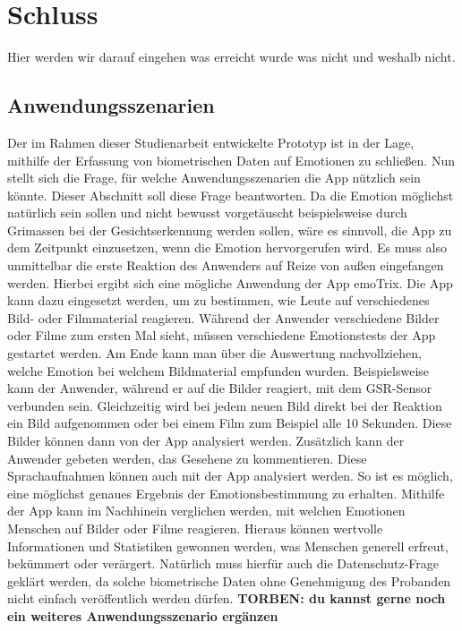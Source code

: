 \section{Schluss}
Hier werden wir darauf eingehen was erreicht wurde was nicht und weshalb nicht.
\subsection{Anwendungsszenarien}
Der im Rahmen dieser Studienarbeit entwickelte Prototyp ist in der Lage, mithilfe der Erfassung von biometrischen Daten auf Emotionen zu schließen. Nun stellt sich die Frage, für welche Anwendungsszenarien die App nützlich sein könnte. Dieser Abschnitt soll diese Frage beantworten. \newline \newline
Da die Emotion möglichst natürlich sein sollen und nicht bewusst vorgetäuscht beispielsweise durch Grimassen bei der Gesichtserkennung werden sollen, wäre es sinnvoll, die App zu dem Zeitpunkt einzusetzen, wenn die Emotion hervorgerufen wird. Es muss also unmittelbar die erste Reaktion des Anwenders auf Reize von außen eingefangen werden. Hierbei ergibt sich eine mögliche Anwendung der App emoTrix. \newline
Die App kann dazu eingesetzt werden, um zu bestimmen, wie Leute auf verschiedenes Bild- oder Filmmaterial reagieren. Während der Anwender verschiedene Bilder oder Filme zum ersten Mal sieht, müssen verschiedene Emotionstests der App gestartet werden. Am Ende kann man über die Auswertung nachvollziehen, welche Emotion bei welchem Bildmaterial empfunden wurden. Beispielsweise kann der Anwender, während er auf die Bilder reagiert, mit dem GSR-Sensor verbunden sein. Gleichzeitig wird bei jedem neuen Bild direkt bei der Reaktion ein Bild aufgenommen oder bei einem Film zum Beispiel alle 10 Sekunden. Diese Bilder können dann von der App analysiert werden. Zusätzlich kann der Anwender gebeten werden, das Gesehene zu kommentieren. Diese Sprachaufnahmen können auch mit der App analysiert werden. So ist es möglich, eine möglichst genaues Ergebnis der Emotionsbestimmung zu erhalten. \newline
Mithilfe der App kann im Nachhinein verglichen werden, mit welchen Emotionen Menschen auf Bilder oder Filme reagieren. Hieraus können wertvolle Informationen und Statistiken gewonnen werden, was Menschen generell erfreut, bekümmert oder verärgert. Natürlich muss hierfür auch die Datenschutz-Frage geklärt werden, da solche biometrische Daten ohne Genehmigung des Probanden nicht einfach veröffentlich werden dürfen.
\textbf{TORBEN: du kannst gerne noch ein weiteres Anwendungsszenario ergänzen}
